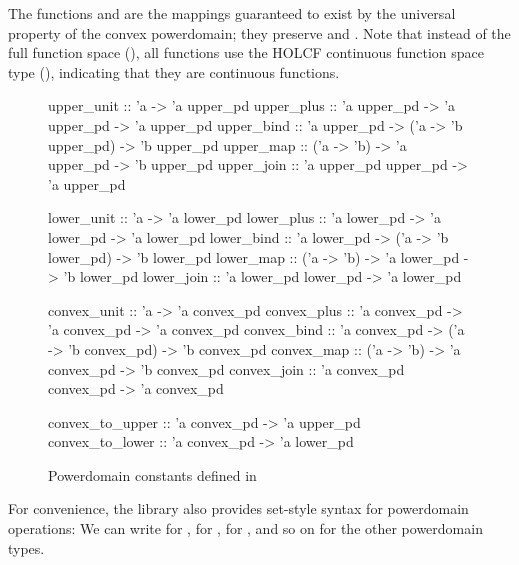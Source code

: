 The functions  and  are the mappings guaranteed to exist by the universal property of the convex powerdomain; they preserve  and . Note that instead of the full function space (\isa{=>}), all functions use the HOLCF continuous function space type (\isa{->}), indicating that they are continuous functions.

\begin{figure}
\begin{isacode}
upper_unit :: 'a -> 'a upper_pd
upper_plus :: 'a upper_pd -> 'a upper_pd -> 'a upper_pd
upper_bind :: 'a upper_pd -> ('a -> 'b upper_pd) -> 'b upper_pd
upper_map :: ('a -> 'b) -> 'a upper_pd -> 'b upper_pd
upper_join :: 'a upper_pd upper_pd -> 'a upper_pd
\end{isacode}
\unmedskip
{}
\begin{isacode}
lower_unit :: 'a -> 'a lower_pd
lower_plus :: 'a lower_pd -> 'a lower_pd -> 'a lower_pd
lower_bind :: 'a lower_pd -> ('a -> 'b lower_pd) -> 'b lower_pd
lower_map :: ('a -> 'b) -> 'a lower_pd -> 'b lower_pd
lower_join :: 'a lower_pd lower_pd -> 'a lower_pd
\end{isacode}
\unmedskip
{}
\begin{isacode}
convex_unit :: 'a -> 'a convex_pd
convex_plus :: 'a convex_pd -> 'a convex_pd -> 'a convex_pd
convex_bind :: 'a convex_pd -> ('a -> 'b convex_pd) -> 'b convex_pd
convex_map :: ('a -> 'b) -> 'a convex_pd -> 'b convex_pd
convex_join :: 'a convex_pd convex_pd -> 'a convex_pd
\end{isacode}
\unmedskip
{}
\begin{isacode}
convex_to_upper :: 'a convex_pd -> 'a upper_pd
convex_to_lower :: 'a convex_pd -> 'a lower_pd
\end{isacode}

\caption{Powerdomain constants defined in }
\label{fig:type-signatures}
\end{figure}

For convenience, the library also provides set-style syntax for powerdomain operations: We can write  for ,  for ,  for , and so on for the other powerdomain types.

